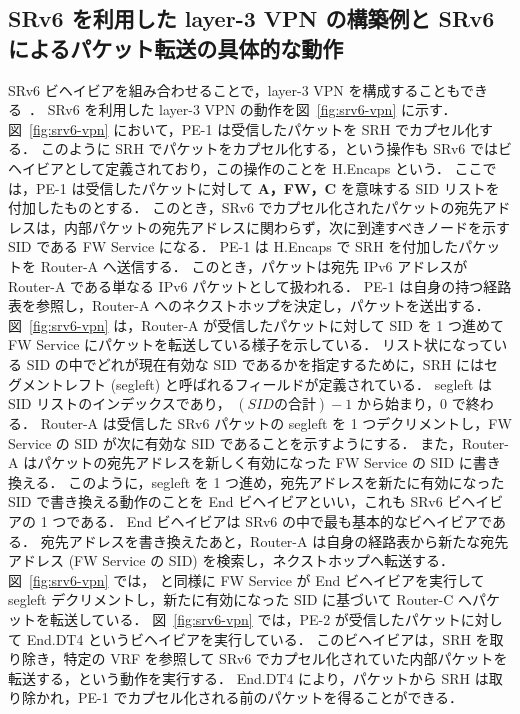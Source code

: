 \subsection*{SRv6 を利用した layer-3 VPN の構築例と SRv6 によるパケット転送の具体的な動作}
\label{sbsection:srv6-vpn}

SRv6 ビヘイビアを組み合わせることで，layer-3 VPN を構成することもできる~\cite{rfc9252}．
SRv6 を利用した layer-3 VPN の動作を図~\ref*{fig:srv6-vpn} に示す．
図~\ref*{fig:srv6-vpn}  において，PE-1 は受信したパケットを SRH でカプセル化する．
このように SRH でパケットをカプセル化する，という操作も SRv6 ではビヘイビアとして定義されており，この操作のことを H.Encaps という．
ここでは，PE-1 は受信したパケットに対して \textbf{A，FW，C} を意味する SID リストを付加したものとする．
このとき，SRv6 でカプセル化されたパケットの宛先アドレスは，内部パケットの宛先アドレスに関わらず，次に到達すべきノードを示す SID である FW Service になる．
PE-1 は H.Encaps で SRH を付加したパケットを Router-A へ送信する．
このとき，パケットは宛先 IPv6 アドレスが Router-A である単なる IPv6 パケットとして扱われる．
PE-1 は自身の持つ経路表を参照し，Router-A へのネクストホップを決定し，パケットを送出する．
図~\ref*{fig:srv6-vpn}  は，Router-A が受信したパケットに対して SID を 1 つ進めて FW Service にパケットを転送している様子を示している．
リスト状になっている SID の中でどれが現在有効な SID であるかを指定するために，SRH にはセグメントレフト (segleft) と呼ばれるフィールドが定義されている．
segleft は SID リストのインデックスであり， $(SID の合計)-1$ から始まり，$0$ で終わる．
Router-A は受信した SRv6 パケットの segleft を 1 つデクリメントし，FW Service の SID が次に有効な SID であることを示すようにする．
また，Router-A はパケットの宛先アドレスを新しく有効になった FW Service の SID に書き換える．
このように，segleft を 1 つ進め，宛先アドレスを新たに有効になった SID で書き換える動作のことを End ビヘイビアといい，これも SRv6 ビヘイビアの 1 つである．
End ビヘイビアは SRv6 の中で最も基本的なビヘイビアである．
宛先アドレスを書き換えたあと，Router-A は自身の経路表から新たな宛先アドレス (FW Service の SID) を検索し，ネクストホップへ転送する．
図~\ref*{fig:srv6-vpn}  では， と同様に FW Service が End ビヘイビアを実行して segleft デクリメントし，新たに有効になった SID に基づいて Router-C へパケットを転送している．
図~\ref*{fig:srv6-vpn}  では，PE-2 が受信したパケットに対して End.DT4 というビヘイビアを実行している．
このビヘイビアは，SRH を取り除き，特定の VRF を参照して SRv6 でカプセル化されていた内部パケットを転送する，という動作を実行する．
End.DT4 により，パケットから SRH は取り除かれ，PE-1 でカプセル化される前のパケットを得ることができる．

